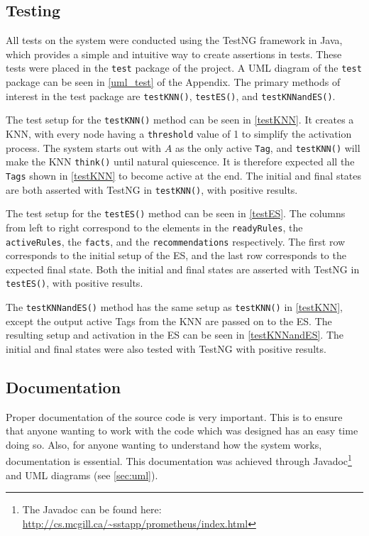 \documentclass[titlepage,11pt]{article}
\newcommand{\code}[1]{\texttt{#1}}
\begin{document}
\subsection{Testing}

All tests on the system were conducted using the TestNG framework in Java, which provides a simple and intuitive way to create assertions in tests. These tests were placed in the \code{test} package of the project. A UML diagram of the \code{test} package can be seen in \autoref{uml_test} of the Appendix. The primary methods of interest in the test package are \code{testKNN()}, \code{testES()}, and \code{testKNNandES()}.

The test setup for the \code{testKNN()} method can be seen in \autoref{testKNN}. It creates a KNN, with every node having a \code{threshold} value of 1 to simplify the activation process. The system starts out with $A$ as the only active \code{Tag}, and \code{testKNN()} will make the KNN \code{think()} until natural quiescence. It is therefore expected all the \code{Tags} shown in \autoref{testKNN} to become active at the end. The initial and final states are both asserted with TestNG in \code{testKNN()}, with positive results.

The test setup for the \code{testES()} method can be seen in \autoref{testES}. The columns from left to right correspond to the elements in the \code{readyRules}, the \code{activeRules}, the \code{facts}, and the \code{recommendations} respectively. The first row corresponds to the initial setup of the ES, and the last row corresponds to the expected final state. Both the initial and final states are asserted with TestNG in \code{testES()}, with positive results.

The \code{testKNNandES()} method has the same setup as \code{testKNN()} in \autoref{testKNN}, except the output active Tags from the KNN are passed on to the ES. The resulting setup and activation in the ES can be seen in \autoref{testKNNandES}. The initial and final states were also tested with TestNG with positive results.

\subsection{Documentation}

Proper documentation of the source code is very important. This is to ensure that anyone wanting to work with the code which was designed has an easy time doing so. Also, for anyone wanting to understand how the system works, documentation is essential. This documentation was achieved through Javadoc\footnote{The Javadoc can be found here: \url{http://cs.mcgill.ca/~sstapp/prometheus/index.html}} and UML diagrams (see \autoref{sec:uml}).
\end{document}
